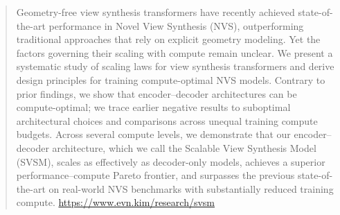 \begin{abstract}

Geometry-free view synthesis transformers have recently achieved state-of-the-art performance in Novel View Synthesis (NVS), outperforming traditional approaches that rely on explicit geometry modeling. Yet the factors governing their scaling with compute remain unclear. 
%
We present a systematic study of scaling laws for view synthesis transformers and derive design principles for training compute-optimal NVS models. Contrary to prior findings, we show that encoder–decoder architectures can be compute-optimal; we trace earlier negative results to suboptimal architectural choices and comparisons across unequal training compute budgets. Across several compute levels, we demonstrate that our encoder–decoder architecture, which we call the Scalable View Synthesis Model (SVSM), scales as effectively as decoder-only models, achieves a superior performance–compute Pareto frontier, and surpasses the previous state-of-the-art on real-world NVS benchmarks with substantially reduced training compute. 
\href{https://www.evn.kim/research/svsm}{https://www.evn.kim/research/svsm}





\end{abstract}
